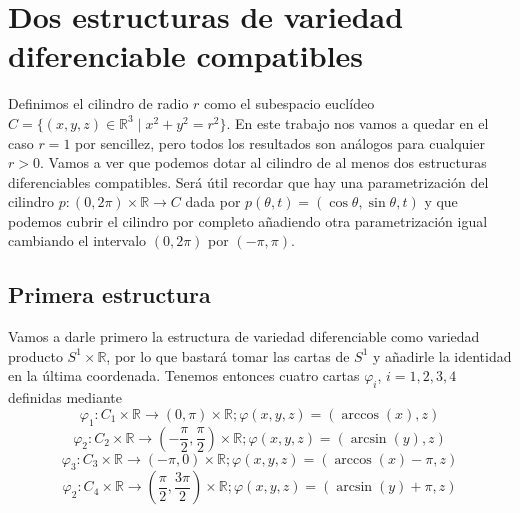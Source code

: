 \documentclass[twoside, 11pt]{article}
\theoremstyle{definition}
\newcommand{\R}{\mathbb{R}}
\begin{document}
\newpage

\section{Dos estructuras de variedad diferenciable compatibles}

Definimos el cilindro de radio $r$ como el subespacio euclídeo $C=\{(x,y,z)\in\R^3\mid x^2+y^2=r^2\}$. En este trabajo nos vamos a quedar en el caso $r=1$ por sencillez, pero todos los resultados son análogos para cualquier $r>0$. Vamos a ver que podemos dotar al cilindro de al menos dos estructuras diferenciables compatibles. Será útil recordar que hay una parametrización del cilindro $p:(0,2\pi)\times\R\to C$ dada por $p(\theta,t)=(\cos\theta,\sin\theta, t)$ y que podemos cubrir el cilindro por completo añadiendo otra parametrización igual cambiando el intervalo $(0,2\pi)$ por $(-\pi,\pi)$. 

\subsection{Primera estructura}

Vamos a darle primero la estructura de variedad diferenciable como variedad producto $S^1\times\R$, por lo que bastará tomar las cartas de $S^1$ y añadirle la identidad en la última coordenada. Tenemos entonces cuatro cartas $\varphi_i$, $i=1,2,3,4$ definidas mediante
\[
\varphi_1:C_1\times\R\to(0,\pi)\times\R; \varphi(x,y,z)=(\arccos(x),z)
\]
\[
\varphi_2:C_2\times\R\to\left(-\frac{\pi}{2},\frac{\pi}{2}\right)\times\R; \varphi(x,y,z)=(\arcsin(y),z)
\]
\[
\varphi_3:C_3\times\R\to(-\pi,0)\times\R; \varphi(x,y,z)=(\arccos(x)-\pi,z)
\]
\[
\varphi_2:C_4\times\R\to\left(\frac{\pi}{2},\frac{3\pi}{2}\right)\times\R; \varphi(x,y,z)=(\arcsin(y)+\pi,z)
\]
\end{document}
